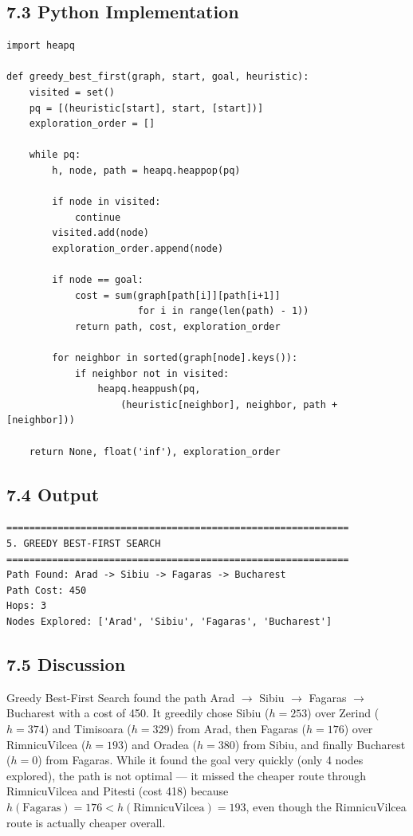 \documentclass[12pt,a4paper]{article}
\begin{document}
\subsection*{7.3 Python Implementation}

\begin{lstlisting}[style=plain, caption={Greedy Best-First Search}]
import heapq

def greedy_best_first(graph, start, goal, heuristic):
    visited = set()
    pq = [(heuristic[start], start, [start])]
    exploration_order = []

    while pq:
        h, node, path = heapq.heappop(pq)

        if node in visited:
            continue
        visited.add(node)
        exploration_order.append(node)

        if node == goal:
            cost = sum(graph[path[i]][path[i+1]]
                       for i in range(len(path) - 1))
            return path, cost, exploration_order

        for neighbor in sorted(graph[node].keys()):
            if neighbor not in visited:
                heapq.heappush(pq,
                    (heuristic[neighbor], neighbor, path + [neighbor]))

    return None, float('inf'), exploration_order
\end{lstlisting}

\subsection*{7.4 Output}

\begin{verbatim}
============================================================
5. GREEDY BEST-FIRST SEARCH
============================================================
Path Found: Arad -> Sibiu -> Fagaras -> Bucharest
Path Cost: 450
Hops: 3
Nodes Explored: ['Arad', 'Sibiu', 'Fagaras', 'Bucharest']
\end{verbatim}

\subsection*{7.5 Discussion}

Greedy Best-First Search found the path Arad $\rightarrow$ Sibiu $\rightarrow$ Fagaras $\rightarrow$ Bucharest with a cost of 450. It greedily chose Sibiu ($h=253$) over Zerind ($h=374$) and Timisoara ($h=329$) from Arad, then Fagaras ($h=176$) over RimnicuVilcea ($h=193$) and Oradea ($h=380$) from Sibiu, and finally Bucharest ($h=0$) from Fagaras. While it found the goal very quickly (only 4 nodes explored), the path is not optimal --- it missed the cheaper route through RimnicuVilcea and Pitesti (cost 418) because $h(\text{Fagaras}) = 176 < h(\text{RimnicuVilcea}) = 193$, even though the RimnicuVilcea route is actually cheaper overall.
\end{document}
